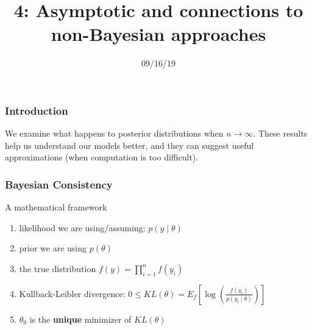 \documentclass{beamer}
\title["4"]{4: Asymptotic and connections to non-Bayesian approaches}
\date{09/16/19}
\begin{document}

\begin{frame}
\titlepage 
\end{frame}

\begin{frame}
\frametitle{Introduction}

We examine what happens to posterior distributions when $n \to \infty$. These results help us understand our models better, and they can suggest useful approximations (when computation is too difficult).
\newline


\end{frame}
\begin{frame}
\frametitle{Bayesian Consistency}

A mathematical framework
\begin{enumerate}
\item likelihood we are using/assuming: $p(y \mid \theta)$
\item prior we are using $p(\theta)$
\item the true distribution $f(y) = \prod_{i=1}^n f(y_i)$
\item Kullback-Leibler divergence: $0 \le KL(\theta) = E_f\left[\log\left(\frac{ f(y_i) }{p(y_i \mid \theta) } \right) \right]$
\item $\theta_0$ is the {\bf unique} minimizer of $KL(\theta)$ 
\end{enumerate}

\end{frame}
\end{document}
